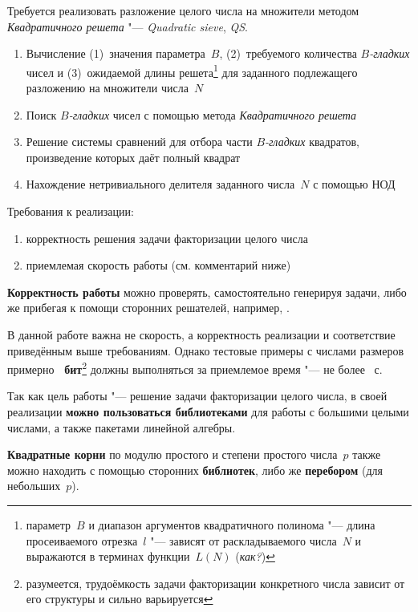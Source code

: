 \documentclass{ca-capstone}
\begin{document}


\goal
Требуется реализовать разложение целого числа на множители методом \emph{Квадратичного
решета} "--- \emph{Quadratic sieve}, \emph{QS}.

\functionality
\begin{enumerate}
  \item Вычисление (1)~значения параметра~$B$, (2)~требуемого количества \emph{$B$-гладких}
    чисел и (3)~ожидаемой длины решета\footnote{параметр~$B$ и диапазон аргументов
    квадратичного полинома "--- длина просеиваемого отрезка~$l$ "--- зависят от раскладываемого
    числа~$N$ и выражаются в терминах функции~$L(N)$ (\emph{как?})} для заданного подлежащего
    разложению на множители числа~$N$
  \item Поиск \emph{$B$-гладких} чисел с помощью метода \emph{Квадратичного решета}
  \item Решение системы сравнений для отбора части \emph{$B$-гладких} квадратов, произведение
    которых даёт полный квадрат
  \item Нахождение нетривиального делителя заданного числа~$N$ с помощью НОД
\end{enumerate}

\requirements
Требования к реализации:
\begin{enumerate}
  \item корректность решения задачи факторизации целого числа
  \item приемлемая скорость работы (см. комментарий ниже)
\end{enumerate}

\textbf{Корректность работы} можно проверять, самостоятельно генерируя задачи, либо же
прибегая к помощи сторонних решателей, например, \cite{alpertron-ecm,sagemath}.

В данной работе важна не скорость, а корректность реализации и соответствие приведённым выше
требованиям. Однако тестовые примеры с числами размеров примерно
\textbf{\ReqBits~бит}\footnote{разумеется, трудоёмкость задачи факторизации конкретного числа
зависит от его структуры и сильно варьируется} должны выполняться за приемлемое время "---
не более \ReqSeconds~с.

\details
Так как цель работы "--- решение задачи факторизации целого числа, в своей реализации
\textbf{можно пользоваться библиотеками} для работы с большими целыми числами, а также пакетами
линейной алгебры.

\textbf{Квадратные корни} по модулю простого и степени простого числа~$p$ также можно находить
с помощью сторонних \textbf{библиотек}, либо же \textbf{перебором} (для небольших~$p$).
\end{document}

